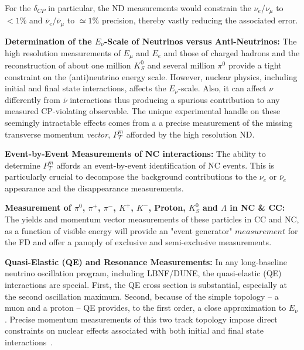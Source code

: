 For the $\delta_{CP}$ in particular, the ND measurements would constrain the $\nu_e$/$\nu_\mu$ to 
$<1\%$ and $\bar \nu_e$/$\bar \nu_\mu$ to $\simeq 1\%$ precision, thereby vastly reducing the associated error. 



\vspace{0.25cm} 
\noindent 
{\bf Determination of the $E_\nu$-Scale of Neutrinos versus Anti-Neutrinos:} The high resolution 
measurements of $E_\mu$ and $E_e$ and those of charged hadrons and the reconstruction of about one 
million $K^0_S$ and several million $\pi^0$ provide a tight constraint on the (anti)neutrino energy scale. 
However,  nuclear physics, including initial and final state interactions, 
 affects the $E_\nu$-scale. Also, it can affect $\nu$ differently from $\bar\nu$ interactions thus  
producing a spurious contribution to any measured CP-violating observable. 
The unique experimental handle on these seemingly intractable effects comes from a 
a precise measurement of the missing transverse momentum {\it vector},{ \bf{ $P^m_T$}} afforded by the 
high resolution ND. 


\vspace{0.25cm} 
\noindent 
{\bf Event-by-Event Measurements of NC interactions:} The ability to determine  { \bf{ $P^m_T$}} affords an event-by-event 
identification of NC events. This is particularly crucial to decompose the background contributions to 
the $\nu_e$ or $\bar \nu_e$ appearance and the disappearance measurements. 


\vspace{0.25cm} 
\noindent 
{\bf Measurement of $\pi^0$, $\pi^+$, $\pi^-$, $K^+$, $K^-$, Proton, $K^0_S$ and $\Lambda$ in NC \& CC:} 
The yields and momentum vector measurements of these particles in CC and NC, as a function of 
visible energy will provide an "event generator" $measurement$ for the FD and offer a panoply 
of exclusive and semi-exclusive measurements. 



\vspace{0.25cm} 
\noindent 
{\bf Quasi-Elastic (QE) and Resonance Measurements:}  
In any long-baseline neutrino oscillation program, including LBNF/DUNE, 
the quasi-elastic (QE) interactions are special. First, the QE cross section is substantial, especially at the second oscillation maximum. 
Second, because of the simple topology -- a muon and a proton -- QE provides, to the first order, 
a close approximation to $E_\nu$.  
Precise momentum measurements  of this two track topology impose direct constraints on nuclear effects 
associated with both initial and final state interactions~\cite{ND-QE}. 

